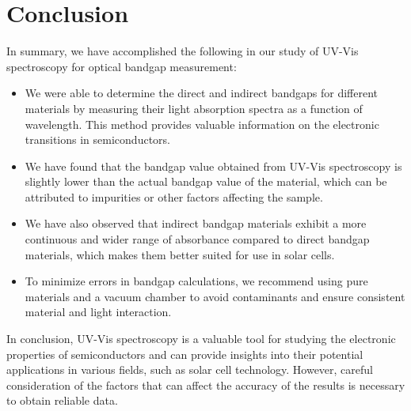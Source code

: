 \section{Conclusion}
	In summary, we have accomplished the following in our study of UV-Vis spectroscopy for optical bandgap measurement:

	\begin{itemize}
		\item We were able to determine the direct and indirect bandgaps for different materials by measuring their light absorption spectra as a function of wavelength. This method provides valuable information on the electronic transitions in semiconductors.
		\item We have found that the bandgap value obtained from UV-Vis spectroscopy is slightly lower than the actual bandgap value of the material, which can be attributed to impurities or other factors affecting the sample.
		\item We have also observed that indirect bandgap materials exhibit a more continuous and wider range of absorbance compared to direct bandgap materials, which makes them better suited for use in solar cells.
		\item To minimize errors in bandgap calculations, we recommend using pure materials and a vacuum chamber to avoid contaminants and ensure consistent material and light interaction.
	\end{itemize}

	In conclusion, UV-Vis spectroscopy is a valuable tool for studying the electronic properties of semiconductors and can provide insights into their potential applications in various fields, such as solar cell technology. However, careful consideration of the factors that can affect the accuracy of the results is necessary to obtain reliable data.